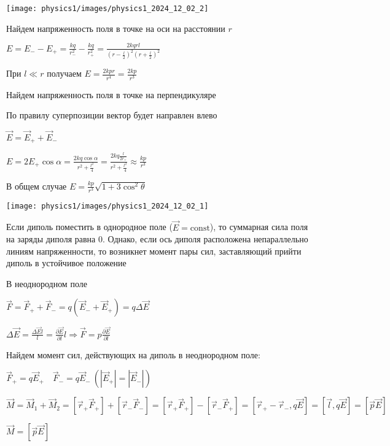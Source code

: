 \documentclass[12pt]{article}
\begin{document}
\begin{center}
    \texttt{[image: physics1/images/physics1\_2024\_12\_02\_2]}
\end{center}

 Найдем напряженность поля в точке на оси на расстоянии $r$

$E = E_- - E_+ = \frac{kq}{r_-^2} - \frac{kq}{r_+^2} = \frac{2kqrl}{(r - \frac{l}{2})^2 (r + \frac{l}{2})^2}$

При $l \ll r$ получаем $E = \frac{2kpr}{r^4} = \frac{2kp}{r^3}$


 Найдем напряженность поля в точке на перпендикуляре

По правилу суперпозиции вектор будет направлен влево

$\vec{E} = \vec{E}_+ + \vec{E}_-$

$E = 2E_+ \cos\alpha = \frac{2kq\cos\alpha}{r^2 + \frac{l^2}{4}} = \frac{2kq\frac{l}{2r_+}}{r^2 + \frac{l^2}{4}} \approx \frac{kp}{r^3}$

 В общем случае $E = \frac{kp}{r^3} \sqrt{1 + 3\cos^2 \theta}$

\begin{center}
    \texttt{[image: physics1/images/physics1\_2024\_12\_02\_1]}
\end{center}

 Если диполь поместить в однородное поле ($\vec{E} = \mathrm{const}$), то суммарная сила поля на заряды диполя равна 0.
Однако, если ось диполя расположена непараллельно линиям напряженности, то возникнет момент пары сил, заставляющий прийти диполь в устойчивое положение

 В неоднородном поле

$\vec{F} = \vec{F}_+ + \vec{F}_- = q(\vec{E}_- + \vec{E}_+) = q\Delta\vec{E}$

$\Delta\vec{E} = \frac{\Delta\vec{E}l}{l} = \frac{\partial \vec{E}}{\partial l}l \Longrightarrow \vec{F} = p\frac{\partial \vec{E}}{\partial l}$

Найдем момент сил, действующих на диполь в неоднородном поле:

$\vec{F}_+ = q\vec{E}_+ \quad \vec{F}_- = q\vec{E}_- \ (|\vec{E}_+| = |\vec{E}_-|)$

$\vec{M} = \vec{M}_1 + \vec{M}_2 = [\vec{r}_+ \vec{F}_+] + [\vec{r}_- \vec{F}_-] = [\vec{r}_+ \vec{F}_+] - [\vec{r}_- \vec{F}_+] = 
[\vec{r}_+ - \vec{r}_-, q\vec{E}] = [\vec{l}, q\vec{E}] = [\vec{p}\vec{E}]$

$\vec{M} = [\vec{p}\vec{E}]$
\end{document}
